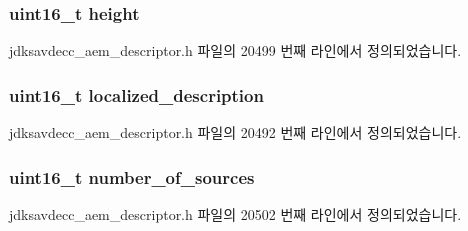\subsubsection[{\texorpdfstring{height}{height}}]{\setlength{\rightskip}{0pt plus 5cm}uint16\+\_\+t height}\hypertarget{structjdksavdecc__descriptor__matrix_a81c9f8d0b8c3b49d770be14dbe9f0d37}{}\label{structjdksavdecc__descriptor__matrix_a81c9f8d0b8c3b49d770be14dbe9f0d37}


jdksavdecc\+\_\+aem\+\_\+descriptor.\+h 파일의 20499 번째 라인에서 정의되었습니다.

\subsubsection[{\texorpdfstring{localized\+\_\+description}{localized_description}}]{\setlength{\rightskip}{0pt plus 5cm}uint16\+\_\+t localized\+\_\+description}\hypertarget{structjdksavdecc__descriptor__matrix_a0926f846ca65a83ad5bb06b4aff8f408}{}\label{structjdksavdecc__descriptor__matrix_a0926f846ca65a83ad5bb06b4aff8f408}


jdksavdecc\+\_\+aem\+\_\+descriptor.\+h 파일의 20492 번째 라인에서 정의되었습니다.

\subsubsection[{\texorpdfstring{number\+\_\+of\+\_\+sources}{number_of_sources}}]{\setlength{\rightskip}{0pt plus 5cm}uint16\+\_\+t number\+\_\+of\+\_\+sources}\hypertarget{structjdksavdecc__descriptor__matrix_a1af3a7f3729937d5da218737ba5b2483}{}\label{structjdksavdecc__descriptor__matrix_a1af3a7f3729937d5da218737ba5b2483}


jdksavdecc\+\_\+aem\+\_\+descriptor.\+h 파일의 20502 번째 라인에서 정의되었습니다.

